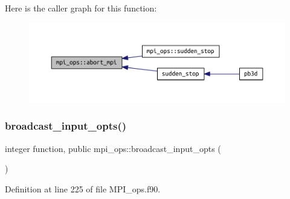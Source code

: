 Here is the caller graph for this function\+:
\nopagebreak
\begin{figure}[H]
\begin{center}
\leavevmode
\includegraphics[width=350pt]{namespacempi__ops_a54d9258ef985728345579e8e57dc8dfe_icgraph}
\end{center}
\end{figure}
\mbox{\label{namespacempi__ops_a932eba1c998dd7a0f1191b55cd754be3}} 
\subsubsection{\texorpdfstring{broadcast\+\_\+input\+\_\+opts()}{broadcast\_input\_opts()}}
{\footnotesize\ttfamily integer function, public mpi\+\_\+ops\+::broadcast\+\_\+input\+\_\+opts (\begin{DoxyParamCaption}{ }\end{DoxyParamCaption})}



Definition at line 225 of file M\+P\+I\+\_\+ops.\+f90.

